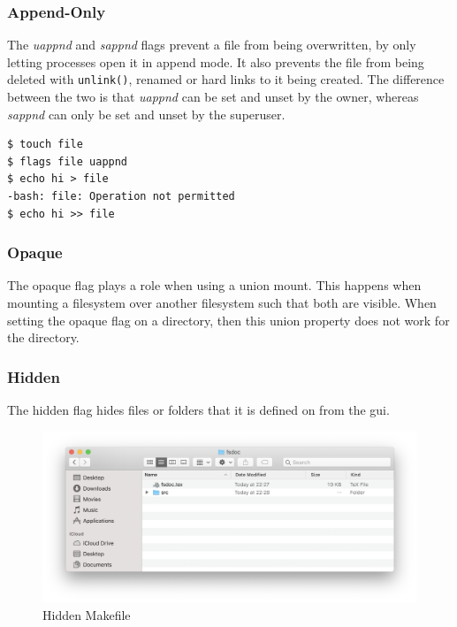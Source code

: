 \documentclass[a4paper]{article}
\begin{document}
\subsubsection{Append-Only}

The \emph{uappnd} and \emph{sappnd} flags prevent a file from being overwritten, by only letting processes open it in append mode. It also prevents the file from being deleted with \verb|unlink()|, renamed or hard links to it being created. The difference between the two is that \emph{uappnd} can be set and unset by the owner, whereas \emph{sappnd} can only be set and unset by the superuser.

\begin{verbatim}
$ touch file
$ flags file uappnd
$ echo hi > file
-bash: file: Operation not permitted
$ echo hi >> file
\end{verbatim}

\subsubsection{Opaque}

The opaque flag plays a role when using a union mount. This happens when mounting a filesystem over another filesystem such that both are visible. When setting the opaque flag on a directory, then this union property does not work for the directory.


\subsubsection{Hidden}

The hidden flag hides files or folders that it is defined on from the \gls{gui}. 

\begin{figure}
\centering\caption{Hidden Makefile}\label{fig:macoshidden}
\includegraphics[width=12cm]{img/hidden}  
\end{figure}
\end{document}
